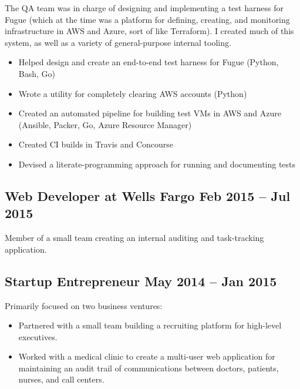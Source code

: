 \documentclass[12pt]{article}
\begin{document}
The QA team was in charge of designing and implementing a test harness for Fugue
(which at the time was a platform for defining, creating, and monitoring
infrastructure in AWS and Azure, sort of like Terraform). I created much of this
system, as well as a variety of general-purpose internal tooling.

\begin{itemize}
\item Helped design and create an end-to-end test harness for Fugue (Python,
  Bash, Go)
\item Wrote a utility for completely clearing AWS accounts (Python)
\item Created an automated pipeline for building test VMs in AWS and Azure
  (Ansible, Packer, Go, Azure Resource Manager)
\item Created CI builds in Travis and Concourse
\item Devised a literate-programming approach for running and documenting tests
\end{itemize}

     
   

\subsection*{Web Developer at Wells Fargo \hfill Feb 2015 -- Jul 2015}

Member of a small team creating an internal auditing and task-tracking
application.

    

\subsection*{Startup Entrepreneur \hfill May 2014 -- Jan 2015}

Primarily focused on two business ventures:

\begin{itemize}
\item Partnered with a small team building a recruiting platform for
  high-level executives.

\item Worked with a medical clinic to create a multi-user web application for
  maintaining an audit trail of communications between doctors, patients,
  nurses, and call centers.
\end{itemize}
\end{document}
